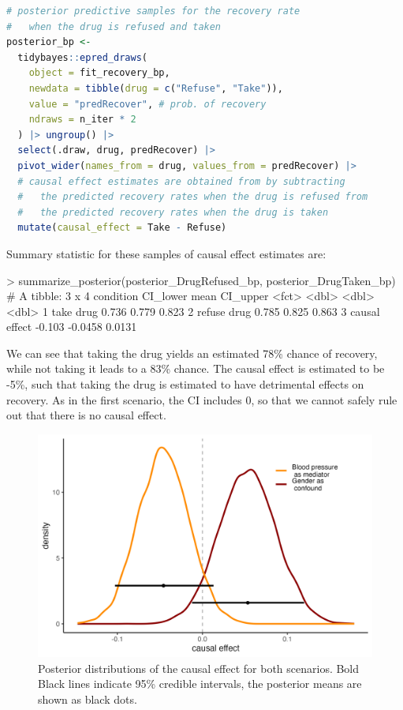 \documentclass[nobib]{tufte-handout}
\begin{document}
\begin{minipage}[]{\textwidth}
\begin{lstlisting}[language=R]
# posterior predictive samples for the recovery rate
#   when the drug is refused and taken
posterior_bp <-
  tidybayes::epred_draws(
    object = fit_recovery_bp,
    newdata = tibble(drug = c("Refuse", "Take")),
    value = "predRecover", # prob. of recovery
    ndraws = n_iter * 2
  ) |> ungroup() |>
  select(.draw, drug, predRecover) |>
  pivot_wider(names_from = drug, values_from = predRecover) |>
  # causal effect estimates are obtained from by subtracting
  #   the predicted recovery rates when the drug is refused from
  #   the predicted recovery rates when the drug is taken
  mutate(causal_effect = Take - Refuse)
\end{lstlisting}
\end{minipage}

\vspace{-0.5cm}
Summary statistic for these samples of causal effect estimates are:

\begin{minipage}[]{\textwidth}
\begin{rc}
> summarize_posterior(posterior_DrugRefused_bp, posterior_DrugTaken_bp)
# A tibble: 3 x 4
  condition     CI_lower    mean CI_upper
  <fct>            <dbl>   <dbl>    <dbl>
1 take drug        0.736  0.779    0.823
2 refuse drug      0.785  0.825    0.863
3 causal effect   -0.103 -0.0458   0.0131
\end{rc}
\end{minipage}

\vspace{-0.5cm}
We can see that taking the drug yields an estimated 78\% chance of recovery, while not taking it leads to a 83\% chance.
The causal effect is estimated to be -5\%, such that taking the drug is estimated to have detrimental effects on recovery.
As in the first scenario, the CI includes 0, so that we cannot safely rule out that there is no causal effect.

\begin{figure}
    \centering
    \includegraphics[width=0.8\linewidth]{../code/posterior_causal_effect_smooth.png}
    \caption{Posterior distributions of the causal effect for both scenarios. Bold Black lines indicate 95\% credible intervals, the posterior means are shown as black dots.}
    \label{fig:posteriors}
\end{figure}
\end{document}
